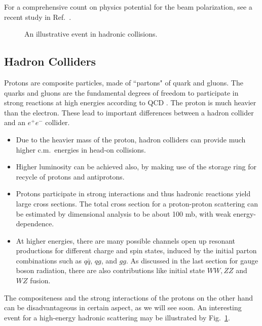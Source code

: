 \documentclass[prd,aps,floats,preprintnumbers,preprint,superscriptaddress,floatfix,nofootinbib]{revtex4}
\def\epem{e^+e^-}
\def\be{\begin{equation}}
\def\ee{\end{equation}}
\begin{document}
For a comprehensive count on physics potential for the
beam polarization, see a recent study in Ref.~\cite{epolar}.

\begin{center}
\begin{figure}[tb]
\caption{An illustrative event in hadronic collisions.
\label{fig:event}}
\end{figure}
\end{center}

\subsection{Hadron Colliders}
Protons are composite particles, made of  ``partons" of quark and gluons. 
The quarks and gluons are the fundamental degrees of freedom to
participate in strong reactions at high energies according to QCD \cite{george}.
%
The proton is much heavier than the electron. 
These lead to important differences  between  a hadron collider and 
an $\epem$ collider.
%
\begin{itemize}
\item Due to the heavier mass of the proton,   hadron colliders can provide 
much higher c.m.~energies in head-on collisions. 
\item Higher luminosity can be achieved also, by making use of the
storage ring for recycle of protons and antiprotons. 
\item Protons participate in strong interactions and thus hadronic
reactions yield large cross sections. The total cross section for a proton-proton
 scattering can be estimated by dimensional analysis to be about 100 mb,
 with weak energy-dependence.
\item
At higher energies, there are many possible channels open up 
resonant productions for
 different charge and spin states,  induced by the initial parton 
 combinations  such as  $q\bar q$, $qg$, and $gg$.
As discussed in the last section for gauge boson radiation, there are also
contributions like initial state $WW, ZZ$ and $WZ$ fusion.
\end{itemize}
%

The compositeness and the strong interactions of the protons 
on the other hand can  be disadvantageous  in certain aspect,
as we will see soon. An interesting event for a high-energy hadronic  
scattering may be illustrated by Fig.~\ref{fig:event}.
\end{document}
